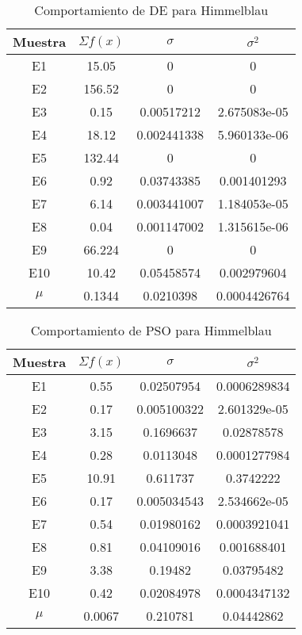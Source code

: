 \documentclass[letterpaper,12pt]{article}
\theoremstyle{definition}
\begin{document}
 \begin{table}
  \begin{center}
    \begin{tabular}{cccc}
      \toprule 
        Muestra & \(\Sigma f(x)\) & \(\sigma\)  & \(\sigma^2\)  \\
        \midrule
        \rowcolor{black!20} E1 & 15.05 & 0 & 0 \\
        E2 & 156.52 & 0 & 0 \\
        \rowcolor{black!20} E3 & 0.15 & 0.00517212 & 2.675083e-05\\
        E4 & 18.12 & 0.002441338 & 5.960133e-06\\
        \rowcolor{black!20} E5 & 132.44 & 0 & 0 \\
        E6 & 0.92 & 0.03743385 & 0.001401293 \\
        \rowcolor{black!20} E7 & 6.14 & 0.003441007 & 1.184053e-05 \\
        E8 & 0.04 & 0.001147002 & 1.315615e-06\\
        \rowcolor{black!20} E9 & 66.224 & 0 & 0 \\
        E10 & 10.42 & 0.05458574 & 0.002979604 \\
        \rowcolor{black!20} \(\mu\) & 0.1344 & 0.0210398 & 0.0004426764 \\ 
        \bottomrule
      \end{tabular}
  \end{center}
  \caption{Comportamiento de DE para Himmelblau}
  \label{tab:de-himm}
\end{table}


\begin{table}
  \begin{center}
    \begin{tabular}{cccc}
      \toprule 
        Muestra & \(\Sigma f(x)\) & \(\sigma\)  & \(\sigma^2\)  \\
        \midrule
        \rowcolor{black!20} E1 & 0.55 & 0.02507954 & 0.0006289834 \\
        E2 & 0.17 & 0.005100322 & 2.601329e-05\\
        \rowcolor{black!20} E3 & 3.15 & 0.1696637 & 0.02878578\\
        E4 & 0.28 & 0.0113048 & 0.0001277984\\
        \rowcolor{black!20} E5 & 10.91 & 0.611737 & 0.3742222 \\
        E6 & 0.17 & 0.005034543 & 2.534662e-05 \\
        \rowcolor{black!20} E7 & 0.54 & 0.01980162 & 0.0003921041 \\
        E8 & 0.81 & 0.04109016 & 0.001688401\\
        \rowcolor{black!20} E9 & 3.38 & 0.19482 & 0.03795482 \\
        E10 & 0.42 & 0.02084978 & 0.0004347132 \\
        \rowcolor{black!20} \(\mu\) & 0.0067 & 0.210781 & 0.04442862 \\ 
        \bottomrule
      \end{tabular}
  \end{center}
  \caption{Comportamiento de PSO para Himmelblau}
  \label{tab:pso-himm}
\end{table}
\end{document}
